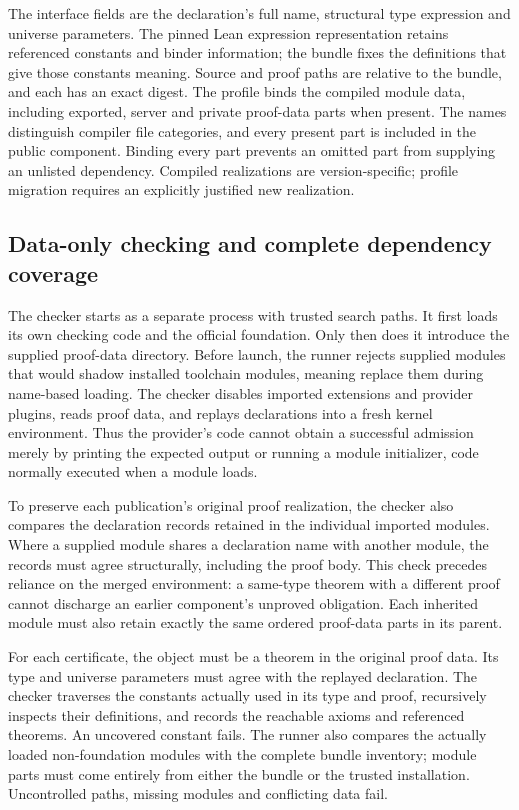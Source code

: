 \documentclass[11pt]{article}
\begin{document}
The interface fields are the declaration's full name, structural type
expression and universe parameters. The pinned Lean expression representation
retains referenced constants and binder information; the bundle fixes the
definitions that give those constants meaning. Source and proof paths are
relative to the bundle, and each has an exact digest. The profile binds the
compiled module data, including exported, server and private proof-data parts
when present. The names distinguish compiler file categories, and every present part
is included in the public component. Binding every part prevents
an omitted part from supplying an unlisted dependency.
Compiled realizations are version-specific; profile migration requires an
explicitly justified new realization.

\subsection{Data-only checking and complete dependency coverage}

The checker starts as a separate process with trusted search paths. It first
loads its own checking code and the official foundation. Only then does it
introduce the supplied proof-data directory. Before launch, the runner rejects
supplied modules that would shadow installed toolchain modules, meaning replace
them during name-based loading. The checker
disables imported extensions and provider plugins, reads proof data, and replays
declarations into a fresh kernel environment. Thus the provider's code cannot
obtain a successful admission merely by printing the expected output or
running a module initializer, code normally executed when a module loads.

To preserve each publication's original proof realization, the checker also
compares the declaration records retained in the individual imported modules.
Where a supplied module shares a declaration name with another module, the
records must agree structurally, including the proof body. This check precedes
reliance on the merged environment: a same-type theorem with a different proof
cannot discharge an earlier component's unproved obligation. Each inherited
module must also retain exactly the same ordered proof-data parts in its parent.

For each certificate, the object must be a theorem in the original proof data.
Its type and universe parameters must agree with the replayed declaration.
The checker traverses the constants actually used in its type and proof,
recursively inspects their definitions, and records the reachable axioms and
referenced theorems. An uncovered constant fails. The runner also compares the
actually loaded non-foundation modules with the complete bundle inventory;
module parts must come entirely from either the bundle or the trusted
installation. Uncontrolled paths, missing modules and conflicting data fail.
\end{document}

